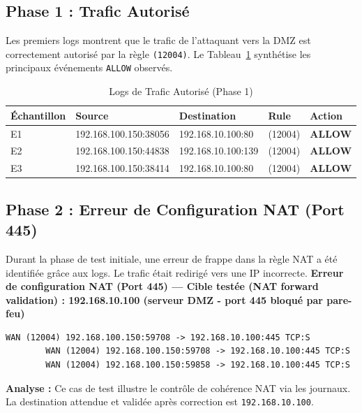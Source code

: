 \documentclass[12pt,a4paper,openany]{report}
\newcommand{\tableheadcolor}{\rowcolor{tableheadbg}}
\begin{document}
	\subsection{Phase 1 : Trafic Autorisé}
	Les premiers logs montrent que le trafic de l'attaquant vers la DMZ est correctement autorisé par la règle \texttt{(12004)}. Le Tableau~\ref{tab:logs-allow} synthétise les principaux événements \texttt{ALLOW} observés.
	
	\begin{table}[ht]
		\centering
		\small
		\renewcommand{\arraystretch}{1.4}
		\setlength{\arrayrulewidth}{0.5pt}
		\begin{tabular}{p{2.4cm} p{4.2cm} p{3.6cm} >{\centering\arraybackslash}p{1.8cm} >{\centering\arraybackslash}p{1.8cm}}
			\arrayrulecolor{tableborder}
			\hline
			\tableheadcolor
			\textcolor{tableheadfg}{\textbf{Échantillon}} &
			\textcolor{tableheadfg}{\textbf{Source}} &
			\textcolor{tableheadfg}{\textbf{Destination}} &
			\textcolor{tableheadfg}{\textbf{Rule}} &
			\textcolor{tableheadfg}{\textbf{Action}} \\
			\hline
			\rowcolor{tablerowalt}
			E1 & 192.168.100.150:38056 & 192.168.10.100:80  & (12004) & \textcolor{green!50!black}{\textbf{ALLOW}} \\
			E2 & 192.168.100.150:44838 & 192.168.10.100:139 & (12004) & \textcolor{green!50!black}{\textbf{ALLOW}} \\
			\rowcolor{tablerowalt}
			E3 & 192.168.100.150:38414 & 192.168.10.100:80  & (12004) & \textcolor{green!50!black}{\textbf{ALLOW}} \\
			\hline
		\end{tabular}
		\caption{Logs de Trafic Autorisé (Phase 1)}
		\label{tab:logs-allow}
	\end{table}
	
	\subsection{Phase 2 : Erreur de Configuration NAT (Port 445)}
	Durant la phase de test initiale, une erreur de frappe dans la règle NAT a été identifiée grâce aux logs. Le trafic était redirigé vers une IP incorrecte.
	\textbf{Erreur de configuration NAT (Port 445) --- Cible testée (NAT forward validation) : 192.168.10.100 (serveur DMZ - port 445 bloqué par pare-feu)}
	
	\begin{lstlisting}[style=logstyle,caption=Preuve de l'erreur NAT dans les logs]
		WAN (12004) 192.168.100.150:59708 -> 192.168.10.100:445 TCP:S
		WAN (12004) 192.168.100.150:59708 -> 192.168.10.100:445 TCP:S
		WAN (12004) 192.168.100.150:59858 -> 192.168.10.100:445 TCP:S
	\end{lstlisting}
	\textbf{Analyse :} Ce cas de test illustre le contrôle de cohérence NAT via les journaux. La destination attendue et validée après correction est \texttt{192.168.10.100}.
	
\end{document}
